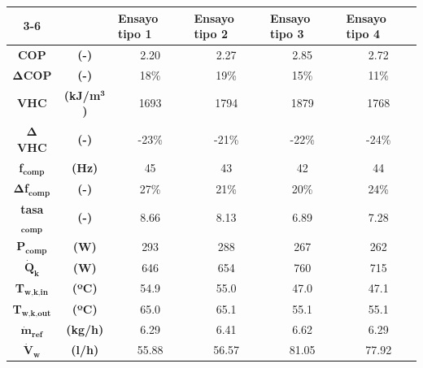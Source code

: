 
\begin{tabular}{cc|c|c|c|c|}
\cline{3-6}
\multicolumn{1}{l}{} & \multicolumn{1}{l|}{} & \multicolumn{1}{l|}{\textbf{Ensayo tipo 1}} & \multicolumn{1}{l|}{\textbf{Ensayo tipo 2}} & \multicolumn{1}{l|}{\textbf{Ensayo tipo 3}} & \multicolumn{1}{l|}{\textbf{Ensayo tipo 4}} \\ \hline
\multicolumn{1}{|c}{\textbf{COP}} & \textbf{(-)} & 2.20 & 2.27 & 2.85 & 2.72 \\ \hline
\multicolumn{1}{|c}{$\bm{\Delta}$\textbf{COP}} & \textbf{(-)} & 18\% & 19\% & 15\% & 11\% \\ \hline
\multicolumn{1}{|c}{\textbf{VHC}} & \textbf{(kJ/m$^\textbf{3}$)} & 1693 & 1794 & 1879 & 1768 \\ \hline
\multicolumn{1}{|c}{$\bm{\Delta}$\textbf{VHC}} & \textbf{(-)} & -23\% & -21\% & -22\% & -24\% \\ \hline
\multicolumn{1}{|c}{\textbf{f}$_\textbf{comp}$} & \textbf{(Hz)} & 45 & 43 & 42 & 44 \\ \hline
\multicolumn{1}{|c}{$\bm{\Delta}$\textbf{f}$_\textbf{comp}$} & \textbf{(-)} & 27\% & 21\% & 20\% & 24\% \\ \hline
\multicolumn{1}{|c}{\textbf{tasa}$_\textbf{comp}$} & \textbf{(-)} & 8.66 & 8.13 & 6.89 & 7.28 \\ \hline
\multicolumn{1}{|c}{\textbf{P}$_\textbf{comp}$} & \textbf{(W)} & 293 & 288 & 267 & 262 \\ \hline
\multicolumn{1}{|c}{$\dot{\textbf{Q}}_\textbf{k}$} & \textbf{(W)} & 646 & 654 & 760 & 715 \\ \hline
\multicolumn{1}{|c}{\textbf{T}$_\textbf{w,k,in}$} & \textbf{(ºC)} & 54.9 & 55.0 & 47.0 & 47.1 \\ \hline
\multicolumn{1}{|c}{\textbf{T}$_\textbf{w,k,out}$} & \textbf{(ºC)} & 65.0 & 65.1 & 55.1 & 55.1 \\ \hline
\multicolumn{1}{|c}{$\dot{\textbf{m}}_\textbf{ref}$} & \textbf{(kg/h)} & 6.29 & 6.41 & 6.62 & 6.29 \\ \hline
\multicolumn{1}{|c}{$\dot{\textbf{V}}_\textbf{w}$} & \textbf{(l/h)} & 55.88 & 56.57 & 81.05 & 77.92 \\ \hline
\end{tabular}
